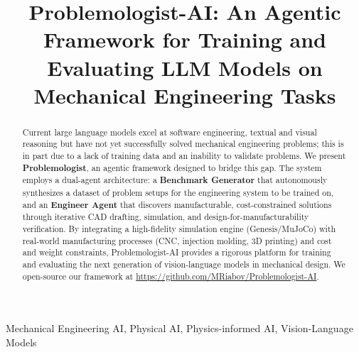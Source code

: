 \documentclass[conference]{IEEEtran}
\begin{document}
\title{Problemologist-AI: An Agentic Framework for Training and Evaluating LLM Models on Mechanical Engineering Tasks}

\author{
}

\maketitle

\begin{abstract}
Current large language models excel at software engineering, textual and visual reasoning but have not yet successfully solved mechanical engineering problems; this is in part due to a lack of training data and an inability to validate problems. We present \textbf{Problemologist}, an agentic framework designed to bridge this gap. The system employs a dual-agent architecture: a \textbf{Benchmark Generator} that autonomously synthesizes a dataset of problem setups for the engineering system to be trained on, and an \textbf{Engineer Agent} that discovers manufacturable, cost-constrained solutions through iterative CAD drafting, simulation, and design-for-manufacturability verification. By integrating a high-fidelity simulation engine (Genesis/MuJoCo) with real-world manufacturing processes (CNC, injection molding, 3D printing) and cost and weight constraints, Problemologist-AI provides a rigorous platform for training and evaluating the next generation of vision-language models in mechanical design. We open-source our framework at \url{https://github.com/MRiabov/Problemologist-AI}.
\end{abstract}

\begin{IEEEkeywords}
Mechanical Engineering AI, Physical AI, Physics-informed AI, Vision-Language Models
\end{IEEEkeywords}
\end{document}
